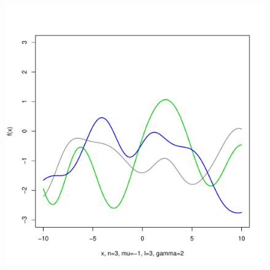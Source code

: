 \documentclass[12pt,letterpaper]{article}
\begin{document}
\begin{figure}
\begin{center}
\includegraphics[scale=0.2]{hw321/n3-m-1-l3-g4.pdf}
\end{center}
\end{figure}
\end{document}

